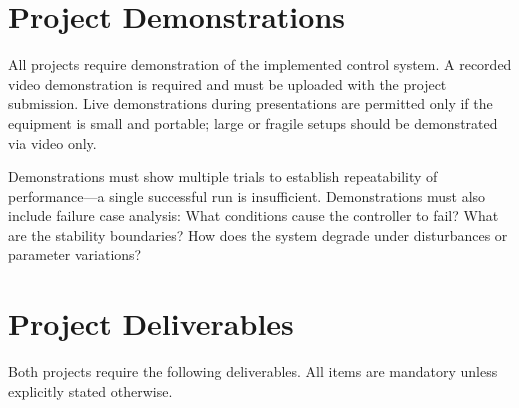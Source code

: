 \documentclass[11pt,letterpaper]{article}
\begin{document}

\section*{Project Demonstrations}
\label{sec:demo-requirements}

All projects require demonstration of the implemented control system. A recorded video demonstration is required and must be uploaded with the project submission. Live demonstrations during presentations are permitted only if the equipment is small and portable; large or fragile setups should be demonstrated via video only.

Demonstrations must show multiple trials to establish repeatability of performance---a single successful run is insufficient. Demonstrations must also include failure case analysis: What conditions cause the controller to fail? What are the stability boundaries? How does the system degrade under disturbances or parameter variations?

\newpage


\section*{Project Deliverables}
\label{sec:deliverables}

Both projects require the following deliverables. All items are mandatory unless explicitly stated otherwise.
\end{document}
